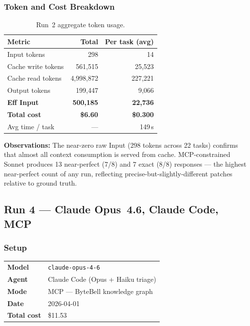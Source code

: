 \subsubsection{Token and Cost Breakdown}

\begin{table}[h]
\centering
\caption{Run~2 aggregate token usage.}\label{tab:r2-tokens}
\begin{tabular}{lrr}
\toprule
\textbf{Metric} & \textbf{Total} & \textbf{Per task (avg)} \\
\midrule
Input tokens         & 298         & 14    \\
Cache write tokens   & 561,515     & 25,523 \\
Cache read tokens    & 4,998,872   & 227,221 \\
Output tokens        & 199,447     & 9,066  \\
\midrule
\textbf{Eff Input}   & \textbf{500,185} & \textbf{22,736} \\
\textbf{Total cost}  & \textbf{\$6.60}  & \textbf{\$0.300} \\
Avg time / task      & ---         & 149\,s \\
\bottomrule
\end{tabular}
\end{table}

\noindent
\textbf{Observations:} The near-zero raw Input (298 tokens across 22 tasks)
confirms that almost all context consumption is served from cache.
MCP-constrained Sonnet produces 13 near-perfect (7/8) and 7 exact (8/8)
responses --- the highest near-perfect count of any run, reflecting
precise-but-slightly-different patches relative to ground truth.

\subsection{Run 4 --- Claude Opus~4.6, Claude Code, MCP}
\label{sec:run4}

\subsubsection{Setup}

\begin{tabular}{ll}
\textbf{Model}     & \texttt{claude-opus-4-6} \\
\textbf{Agent}     & Claude Code (Opus + Haiku triage) \\
\textbf{Mode}      & MCP --- ByteBell knowledge graph \\
\textbf{Date}      & 2026-04-01 \\
\textbf{Total cost} & \$11.53 \\
\end{tabular}

